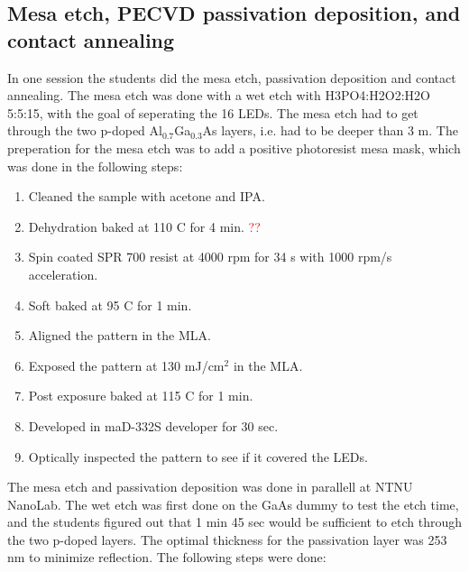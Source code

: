 \subsection{Mesa etch, PECVD passivation deposition, and contact annealing}
\label{methods:PECVD}
In one session the students did the mesa etch, passivation deposition and contact annealing.
The mesa etch was done with a wet etch with H3PO4:H2O2:H2O 5:5:15, with the goal of seperating the 16 LEDs.
The mesa etch had to get through the two p-doped Al$_0.7$Ga$_0.3$As layers, i.e. had to be deeper than 3 \textmu m.
The preperation for the mesa etch was to add a positive photoresist mesa mask, which was done in the following steps:

\begin{enumerate}
    \item Cleaned the sample with acetone and IPA.
    \item Dehydration baked at 110 \textdegree C for 4 min. \textcolor{red}{??}
    \item Spin coated SPR 700 resist at 4000 rpm for 34 s with 1000 rpm/s acceleration.
    \item Soft baked at 95 \textdegree C for 1 min.
    \item Aligned the pattern in the MLA.
    \item Exposed the pattern at 130 mJ/cm$^2$ in the MLA.
    \item Post exposure baked at 115 \textdegree C for 1 min.
    \item Developed in maD-332S developer for 30 sec.
    \item Optically inspected the pattern to see if it covered the LEDs.
\end{enumerate}

The mesa etch and passivation deposition was done in parallell at NTNU NanoLab.
The wet etch was first done on the GaAs dummy to test the etch time, and the students figured out that 1 min 45 sec would be sufficient to etch through the two p-doped layers.
The optimal thickness for the passivation layer was 253 nm to minimize reflection.
The following steps were done:

